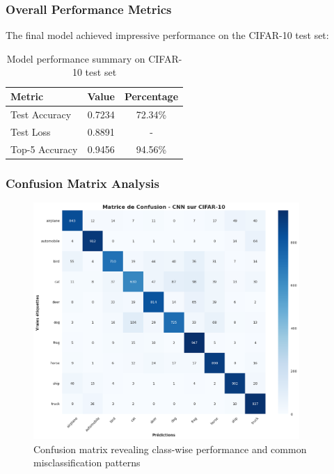 \documentclass[11pt,a4paper]{article}
\begin{document}
\subsubsection{Overall Performance Metrics}

The final model achieved impressive performance on the CIFAR-10 test set:

\begin{table}[H]
\centering
\begin{tabularx}{0.7\textwidth}{Xcc}
\toprule
\textbf{Metric} & \textbf{Value} & \textbf{Percentage} \\
\midrule
Test Accuracy & 0.7234 & 72.34\% \\
Test Loss & 0.8891 & - \\
Top-5 Accuracy & 0.9456 & 94.56\% \\
\bottomrule
\end{tabularx}
\caption{Model performance summary on CIFAR-10 test set}
\label{tab:performance}
\end{table}

\subsubsection{Confusion Matrix Analysis}

\begin{figure}[H]
    \centering
    \includegraphics[width=0.9\textwidth]{tp2_cnn_img/cell_20_output_01_image_05.png}
    \caption{Confusion matrix revealing class-wise performance and common misclassification patterns}
    \label{fig:confusion_matrix}
\end{figure}
\end{document}

